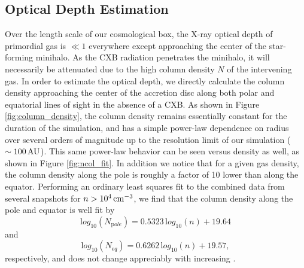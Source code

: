 \documentclass[../thesis.tex]{subfiles}
\begin{document}
\subsection{Optical Depth Estimation}
\label{attenuation}
Over the length scale of our cosmological box, the X-ray optical depth of primordial gas is $\ll 1$ everywhere except approaching the center of the star-forming minihalo. As the CXB radiation penetrates the minihalo, it will necessarily be attenuated due to the high column density $N$ of the intervening gas.  In order to estimate the optical depth, we directly calculate the column density approaching the center of the accretion disc along both polar and equatorial lines of sight in the absence of a CXB. As shown in Figure \ref{fig:column_density}, the column density remains essentially constant for the duration of the simulation, and has a simple power-law dependence on radius over several orders of magnitude up to the resolution limit of our simulation ($\sim100\,\mathrm{AU}$). This same power-law behavior can be seen versus density as well, as shown in Figure \ref{fig:ncol_fit}. In addition we notice that for a given gas density, the column density along the pole is roughly a factor of 10 lower than along the equator.  Performing an ordinary least squares fit to the combined data from several snapshots for $n > 10^4\,\mathrm{cm}^{-3}$, we find that the column density along the pole and equator is well fit by 
\begin{equation}
{\mathrm log}_{10}(N_{\mathrm pole}) = 0.5323\, {\mathrm log_{10}}(n) + 19.64
\end{equation}
and
\begin{equation}
{\mathrm log}_{10}(N_{\mathrm eq}) = 0.6262\, {\mathrm log_{10}}(n) + 19.57, 
\end{equation}
respectively, and does not change appreciably with increasing \jxr.
\end{document}
